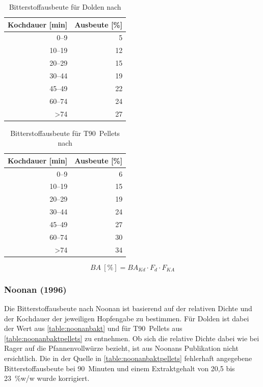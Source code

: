 \documentclass[a4paper,parskip=half]{scrartcl}
\newcommand{\BA}{\mathit{BA}}
\newcommand{\BAKt}{{\mathit{BA}}_{\mathit{Kd}}}
\newcommand{\uper}{\:[\text{\%}]}
\newcommand{\FKd}{F_{\mathit{d}}}
\newcommand{\FHR}{F_{\mathit{KA}}}
\begin{document}
\begin{table}[H]
\centering
\begin{tabular}{rr}
\toprule
\multicolumn{1}{c}{\textbf{Kochdauer [min]}} & \multicolumn{1}{c}{\textbf{Ausbeute [\%]}} \\
\midrule
0–9            & 5  \\
10–19          & 12 \\
20–29          & 15 \\
30–44          & 19 \\
45–49          & 22 \\
60–74          & 24 \\
>74            & 27 \\
\bottomrule
\end{tabular}
\caption{Bitterstoffausbeute für Dolden nach \citeauthor{Daniels1996} \parencite[80]{Daniels1996}}
\label{table:danielsbakt}
\end{table}

\begin{table}[H]
\centering
\begin{tabular}{rr}
\toprule
\multicolumn{1}{c}{\textbf{Kochdauer [min]}} & \multicolumn{1}{c}{\textbf{Ausbeute [\%]}} \\
\midrule
0–9            & 6 \\
10–19          & 15 \\
20–29          & 19 \\
30–44          & 24 \\
45–49          & 27 \\
60–74          & 30 \\
>74            & 34 \\
\bottomrule
\end{tabular}
\caption{Bitterstoffausbeute für T90~Pellets nach \citeauthor{Daniels1996} \parencite[80]{Daniels1996}}
\label{table:danielsbaktpellets}
\end{table}

\begin{equation}
\BA \uper = \BAKt \cdot \FKd \cdot \FHR
\label{eq:danielsba}
\end{equation}


\subsubsection*{Noonan (1996)}

Die Bitterstoffausbeute nach Noonan ist basierend auf der relativen Dichte und der Kochdauer der jeweiligen Hopfengabe zu bestimmen. Für Dolden ist dabei der Wert aus \autoref{table:noonanbakt} und für T90~Pellets aus \autoref{table:noonanbaktpellets} zu entnehmen. Ob sich die relative Dichte dabei wie bei Rager auf die Pfannenvollwürze bezieht, ist aus Noonans Publikation nicht ersichtlich. Die in der Quelle in \autoref{table:noonanbaktpellets} fehlerhaft angegebene Bitterstoffausbeute bei 90~Minuten und einem Extraktgehalt von 20,5 bis 23~\%w/w wurde korrigiert.
\end{document}
